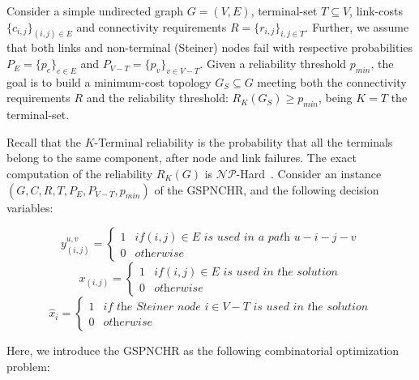 \documentclass{llncs}
\begin{document}
\begin{definition}[GSPNCHR]
Consider a simple undirected graph $G=(V,E)$, terminal-set $T \subseteq V$, link-costs $\{c_{i,j}\}_{(i,j) \in E}$ 
and connectivity requirements $R=\{r_{i,j}\}_{i,j \in T}$. Further, we assume that both links and non-terminal (Steiner) nodes 
fail with respective probabilities $P_E=\{p_e\}_{e\in E}$ and $P_{V-T}=\{p_v\}_{v\in V-T}$. 
Given a reliability threshold $p_{min}$, the goal is to build 
a minimum-cost topology $G_S \subseteq G$ meeting both the connectivity requirements 
$R$ and the reliability threshold: $R_{K}(G_S) \geq p_{min}$, being $K=T$ the terminal-set.
\end{definition}

Recall that the $K$-Terminal reliability is the probability that all the terminals belong to the same component, after 
node and link failures. The exact computation of the reliability $R_K(G)$ is $\mathcal{NP}$-Hard~\cite{9}. 
Consider an instance $(G,C,R,T,P_E,P_{V-T},p_{min})$ of the GSPNCHR, and the following decision variables:

\[
    y_{(i,j)}^{u,v}=\left\{
                \begin{array}{ll}
1 & \textit{if} (i,j)\in E \, \, \textit{is used in a path} \, \, u-i-j-v\\
0 & \textit{otherwise}
                \end{array}
              \right.
  \]
\[
    x_{(i,j)}=\left\{
                \begin{array}{ll}
1 & \textit{if}  (i,j)\in E \, \, \textit{is used in the solution}\\
0 & \textit{otherwise} 
                \end{array}
              \right.
  \]
\[
    \hat{x}_{i}=\left\{
                \begin{array}{ll}
1 & \textit{if the Steiner node} \, \, i \in V-T \, \, \textit{is used in the solution}\\
0 & \textit{otherwise}
                \end{array}
              \right.
  \]

Here, we introduce the GSPNCHR as the following combinatorial optimization problem:
\end{document}
